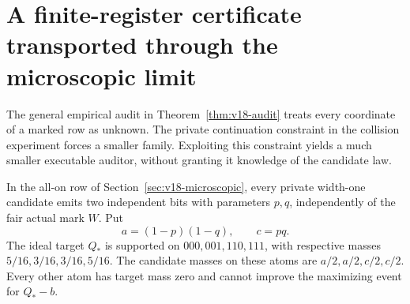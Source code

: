 \section{A finite-register certificate transported through the microscopic limit}
\label{sec:v19-certificate}
The general empirical audit in Theorem~\ref{thm:v18-audit} treats every
coordinate of a marked row as unknown. The private continuation constraint
in the collision experiment forces a smaller family. Exploiting this
constraint yields a much smaller executable auditor, without granting it
knowledge of the candidate law.

In the all-on row of Section~\ref{sec:v18-microscopic}, every private
width-one candidate emits two independent bits with parameters $p,q$,
independently of the fair actual mark $W$. Put
\[
 a=(1-p)(1-q),\qquad c=pq.
\]
The ideal target $Q_*$ is supported on $000,001,110,111$, with respective
masses $5/16,3/16,3/16,5/16$. The candidate masses on these atoms are
$a/2,a/2,c/2,c/2$. Every other atom has target mass zero and cannot improve
the maximizing event for $Q_*-b$.

